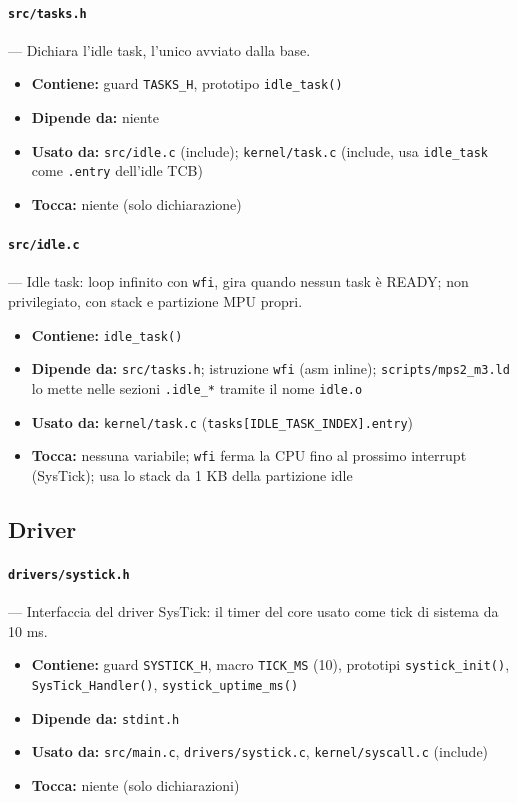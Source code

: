 \paragraph{\texttt{src/tasks.h}} --- Dichiara l'idle task, l'unico avviato dalla base.
\begin{itemize}
  \item \textbf{Contiene:} guard \texttt{TASKS\_H}, prototipo \texttt{idle\_task()}
  \item \textbf{Dipende da:} niente
  \item \textbf{Usato da:} \texttt{src/idle.c} (include); \texttt{kernel/task.c} (include, usa \texttt{idle\_task} come \texttt{.entry} dell'idle TCB)
  \item \textbf{Tocca:} niente (solo dichiarazione)
\end{itemize}

\paragraph{\texttt{src/idle.c}} --- Idle task: loop infinito con \texttt{wfi}, gira quando nessun task è READY; non privilegiato, con stack e partizione MPU propri.
\begin{itemize}
  \item \textbf{Contiene:} \texttt{idle\_task()}
  \item \textbf{Dipende da:} \texttt{src/tasks.h}; istruzione \texttt{wfi} (asm inline); \texttt{scripts/mps2\_m3.ld} lo mette nelle sezioni \texttt{.idle\_*} tramite il nome \texttt{idle.o}
  \item \textbf{Usato da:} \texttt{kernel/task.c} (\texttt{tasks[IDLE\_TASK\_INDEX].entry})
  \item \textbf{Tocca:} nessuna variabile; \texttt{wfi} ferma la CPU fino al prossimo interrupt (SysTick); usa lo stack da 1 KB della partizione idle
\end{itemize}

\subsection{Driver}

\paragraph{\texttt{drivers/systick.h}} --- Interfaccia del driver SysTick: il timer del core usato come tick di sistema da 10 ms.
\begin{itemize}
  \item \textbf{Contiene:} guard \texttt{SYSTICK\_H}, macro \texttt{TICK\_MS} (10), prototipi \texttt{systick\_init()}, \texttt{SysTick\_Handler()}, \texttt{systick\_uptime\_ms()}
  \item \textbf{Dipende da:} \texttt{stdint.h}
  \item \textbf{Usato da:} \texttt{src/main.c}, \texttt{drivers/systick.c}, \texttt{kernel/syscall.c} (include)
  \item \textbf{Tocca:} niente (solo dichiarazioni)
\end{itemize}

